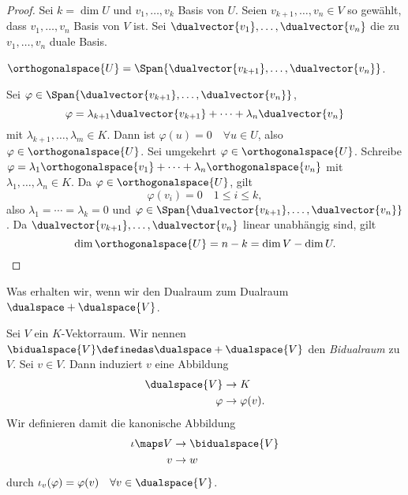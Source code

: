 \begin{proof}
  Sei \( k=\dim{U} \) und \( v_1,\dotsc,v_k \) Basis von \( U \). Seien \( v_{k+1},\dotsc, v_n\in V \) so gewählt, dass \( v_1,\dotsc, v_n \) Basis von \( V  \) ist. Sei \( \dualvector{v_1},\dotsc, \dualvector{v_n} \) die zu \( v_1,\dotsc,v_n \) duale Basis.
  \begin{behauptung}
    \( \orthogonalspace{U}=\Span{\dualvector{v_{k+1}},\dotsc,\dualvector{v_n}} \).
  \end{behauptung}
  Sei \( \varphi\in \Span{\dualvector{v_{k+1}},\dotsc,\dualvector{v_n}} \), \dh
  \begin{equation*}
    \varphi=\lambda_{k+1}\dualvector{v_{k+1}}+\dotsb+\lambda_n \dualvector{v_n}
  \end{equation*}
  mit \( \lambda_{k+1},\dotsc, \lambda_m\in K \). Dann ist \( \varphi(u)=0 \quad \forall u\in U\), also \( \varphi\in \orthogonalspace{U} \). Sei umgekehrt \( \varphi\in \orthogonalspace{U} \). Schreibe \( \varphi=\lambda_1 \orthogonalspace{v_1}+\dotsb+\lambda_n \orthogonalspace{v_n} \) mit \( \lambda_1,\dotsc,\lambda_n\in K \). Da \( \varphi\in \orthogonalspace{U} \), gilt
  \begin{equation*}
    \varphi(v_i)=0\quad 1\leq i\leq k,
  \end{equation*}
  also \( \lambda_1=\dotsb=\lambda_k=0 \) und \( \varphi\in \Span{\dualvector{v_{k+1}},\dotsc,\dualvector{v_n}} \). Da \( \dualvector{v_{k+1}},\dotsc,\dualvector{v_n} \) linear unabhängig sind, gilt
  \begin{equation*}
    \dim{\orthogonalspace{U}}=n-k=\dim{V}-\dim{U}.
  \end{equation*}
\end{proof}
\begin{frage*}
  Was erhalten wir, wenn wir den Dualraum zum Dualraum \( \dualspace+{\dualspace{V}} \).
\end{frage*}
\begin{definition*}
  Sei \( V \) ein \( K \)-Vektorraum. Wir nennen \( \bidualspace{V}\definedas \dualspace+{\dualspace{V}} \) den \emph{Bidualraum} zu \( V \). Sei \( v\in V \). Dann induziert \( v \) eine Abbildung
  \begin{equation*}
    \begin{split}
      \dualspace{V}&\to K\\
      \varphi&\to \varphi(v).
    \end{split}
  \end{equation*}
  Wir definieren damit die kanonische Abbildung
  \begin{equation*}
    \begin{split}
      \iota\maps V&\to \bidualspace{V}\\
      v&\to w
    \end{split}
  \end{equation*}
  durch \( \iota_v(\varphi)=\varphi(v)\quad \forall v\in\dualspace{V} \).
\end{definition*}
